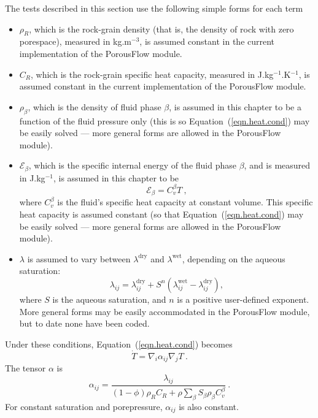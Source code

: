 \documentclass[]{scrreprt}
\def\phase{\beta}
\def\energydens{\mathcal{E}}
\begin{document}
The tests described in this section use the following simple forms for
each term
\begin{itemize}
\item $\rho_{R}$, which is the rock-grain density (that is, the
  density of rock with zero porespace), measured in kg.m$^{-3}$, is
  assumed constant in the current implementation of the PorousFlow
  module.
\item $C_{R}$, which is the rock-grain specific heat capacity, measured
  in J.kg$^{-1}$.K$^{-1}$, is assumed constant in the current
  implementation of the PorousFlow module.
\item $\rho_{\phase}$, which is the density of fluid phase $\phase$,
  is assumed in this chapter to be a function of the fluid pressure
  only (this is so Equation~(\ref{eqn.heat.cond}) may be easily solved
  --- more general forms are allowed in the PorousFlow module).
\item $\energydens_{\phase}$, which is the specific internal energy of the
  fluid phase $\phase$, and is measured in J.kg$^{-1}$, is assumed in
  this chapter to be
\begin{equation}
\energydens_{\phase} = C_{v}^{\phase} T \ ,
\end{equation}
where $C_{v}^{\phase}$ is the fluid's specific heat capacity at
constant volume.  This specific heat capacity is assumed constant (so
that Equation~(\ref{eqn.heat.cond}) may be easily solved --- more
general forms are allowed in the PorousFlow module).
\item $\lambda$ is assumed to vary between $\lambda^{\mathrm{dry}}$
  and $\lambda^{\mathrm{wet}}$, depending on the aqueous saturation:
\begin{equation}
\lambda_{ij} = \lambda_{ij}^{\mathrm{dry}} + S^{n} \left(
\lambda_{ij}^{\mathrm{wet}} - \lambda_{ij}^{\mathrm{dry}} \right) ,
\end{equation}
where $S$ is the aqueous saturation, and $n$ is a positive user-defined
exponent.  More general forms may be easily accommodated in the
PorousFlow module, but to date none have been coded.
\end{itemize}

Under these conditions, Equation~(\ref{eqn.heat.cond}) becomes
\begin{equation}
\dot{T} = \nabla_{i} \alpha_{ij} \nabla_{j} T \ .
\label{eqn.heat.cond.simple}
\end{equation}
The tensor $\alpha$ is
\begin{equation}
\alpha_{ij} = \frac{\lambda_{ij}}{(1 - \phi)\rho_{R}C_{R} +
  \rho\sum_{\phase}S_{\phase}\rho_{\phase}C_{v}^{\phase}} \ .
\end{equation}
For constant saturation and porepressure, $\alpha_{ij}$ is also constant.
\end{document}

